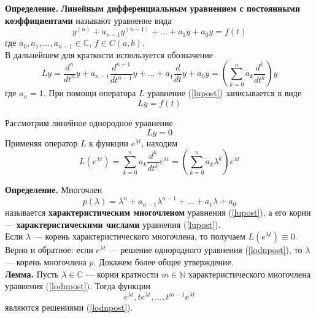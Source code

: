 \textbf{Определение.} \textbf{Линейным дифференциальным уравнением с постоянными коэффициентами} называют уравнение вида
\begin{equation}
    y^{(n)} + a_{n - 1}y^{(n-1)} + \ldots + a_1\dot{y} + a_0y = f(t) \label{lupost}
\end{equation}
где $a_0, a_1, \ldots, a_{n-1} \in \mathbb{C}$, $f \in C(a,b)$.\\

В дальнейшем для краткости используется обозначение
\begin{equation*}
    Ly = \frac{d^n}{dt^n}y + a_{n-1}\frac{d^{n-1}}{dt^{n-1}}y + \ldots + a_1\frac{d}{dt}y + a_0y = \left(\sum_{k = 0}^n a_k\frac{d^k}{dt^k} \right)y
\end{equation*}
где $a_n = 1$. При помощи оператора $L$ уравнение (\ref{lupost}) записывается в виде
\begin{equation*}
    Ly = f(t)
\end{equation*}

Рассмотрим линейное однородное уравнение
\begin{equation}
    Ly = 0 \label{lodnpost}
\end{equation}
Применяя оператор $L$ к функции $e^{\lambda t}$, находим
\begin{equation*}
    L(e^{\lambda t}) = \sum_{k = 0}^n a_k\frac{d^k}{dt^k}e^{\lambda t} = \left(\sum_{k = 0}^n a_k\lambda^k \right)e^{\lambda t}
\end{equation*}

\noindent \textbf{Определение.} Многочлен
\begin{equation*}
    p(\lambda) = \lambda^n + a_{n-1}\lambda^{n-1} + \ldots + a_1\lambda + a_0
\end{equation*}
называется \textbf{характеристическим многочленом} уравнения (\ref{lupost}), а его корни --- \textbf{характеристическими числами} уравнения (\ref{lupost}).\\

Если $\lambda$ --- корень характеристического многочлена, то получаем $L(e^{\lambda t}) \equiv 0$. Верно и обратное: если $e^{\lambda t}$ --- решение однородного уравнения (\ref{lodnpost}), то $\lambda$ --- корень многочлена $p$. Докажем более общее утверждение.\\

\noindent \textbf{Лемма.} Пусть $\lambda \in \mathbb{C}$ --- корни кратности $m \in \mathbb{N}$ характеристического многочлена уравнения (\ref{lodnpost}). Тогда функции
\begin{equation*}
    e^{\lambda t}, te^{\lambda t}, \ldots, t^{m-1}e^{\lambda t}
\end{equation*}
являются решениями (\ref{lodnpost}).\\

